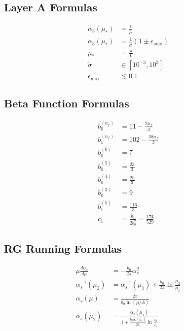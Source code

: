\documentclass[11pt,a4paper]{article}
\theoremstyle{definition}
\begin{document}
\subsection{Layer A Formulas}
\label{subsec:cat-layer-a}

\begin{align}
\label{eq:cat-1}
\alpha_3(\mu_*) &= \frac{1}{\tilde{\sigma}} \\
\label{eq:cat-2}
\alpha_3(\mu_*) &= \frac{1}{\tilde{\sigma}}(1 \pm \epsilon_{\max}) \\
\label{eq:cat-3}
\mu_* &= \frac{\pi}{L} \\
\label{eq:cat-4}
\tilde{\sigma} &\in [10^{-3}, 10^3] \\
\label{eq:cat-5}
\epsilon_{\max} &\lesssim 0.1
\end{align}

\subsection{Beta Function Formulas}
\label{subsec:cat-beta}

\begin{align}
\label{eq:cat-6}
b_0^{(n_f)} &= 11 - \frac{2n_f}{3} \\
\label{eq:cat-7}
b_1^{(n_f)} &= 102 - \frac{38n_f}{3} \\
\label{eq:cat-8}
b_0^{(6)} &= 7 \\
\label{eq:cat-9}
b_0^{(5)} &= \frac{23}{3} \\
\label{eq:cat-10}
b_0^{(4)} &= \frac{25}{3} \\
\label{eq:cat-11}
b_0^{(3)} &= 9 \\
\label{eq:cat-12}
b_1^{(5)} &= \frac{116}{3} \\
\label{eq:cat-13}
c_1 &= \frac{b_1}{2b_0^2} = \frac{174}{529}
\end{align}

\subsection{RG Running Formulas}
\label{subsec:cat-rg}

\begin{align}
\label{eq:cat-14}
\mu\frac{d\alpha_s}{d\mu} &= -\frac{b_0}{2\pi}\alpha_s^2 \\
\label{eq:cat-15}
\alpha_s^{-1}(\mu_2) &= \alpha_s^{-1}(\mu_1) + \frac{b_0}{2\pi}\ln\frac{\mu_2}{\mu_1} \\
\label{eq:cat-16}
\alpha_s(\mu) &= \frac{2\pi}{b_0\ln(\mu/\Lambda)} \\
\label{eq:cat-17}
\alpha_s(\mu_2) &= \frac{\alpha_s(\mu_1)}{1 + \frac{b_0\alpha_s(\mu_1)}{2\pi}\ln\frac{\mu_2}{\mu_1}}
\end{align}
\end{document}
